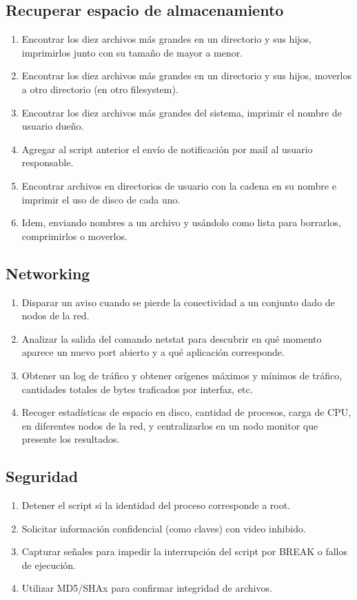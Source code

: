 \subsection{Recuperar espacio de almacenamiento}
\begin{enumerate}
	\item Encontrar los diez archivos más grandes en un directorio y sus hijos, imprimirlos junto con su tamaño de mayor a menor.
	\item Encontrar los diez archivos más grandes en un directorio y sus hijos, moverlos a otro directorio (en otro filesystem).
	\item Encontrar los diez archivos más grandes del sistema, imprimir el nombre de usuario dueño.
	\item Agregar al script anterior el envío de notificación por mail al usuario responsable.
		\item 
Encontrar archivos en directorios de usuario con la cadena  en su nombre e imprimir el uso de disco de cada uno.
	\item 
Idem, enviando nombres a un archivo y usándolo como lista para borrarlos, comprimirlos o moverlos.

\end{enumerate}



\subsection{Networking}
\begin{enumerate}
	\item 
Disparar un aviso cuando se pierde la conectividad a un conjunto dado de nodos de la red.
	\item 
Analizar la salida del comando netstat para descubrir en qué momento aparece un nuevo port abierto y a qué aplicación corresponde.
	\item 
Obtener un log de tráfico y obtener orígenes máximos y mínimos de tráfico, cantidades totales de bytes traficados por interfaz, etc.
	\item 
Recoger estadísticas de espacio en disco, cantidad de procesos, carga de CPU, en diferentes nodos de la red, y centralizarlos en un nodo monitor que presente los resultados.
\end{enumerate}

\subsection{Seguridad}
\begin{enumerate}
	\item 
Detener el script si la identidad del proceso corresponde a root.
	\item 
Solicitar información confidencial (como claves) con video inhibido.
	\item 
Capturar señales para impedir la interrupción del script por BREAK o fallos de ejecución.
	\item 
Utilizar MD5/SHAx para confirmar integridad de archivos.
\end{enumerate}




